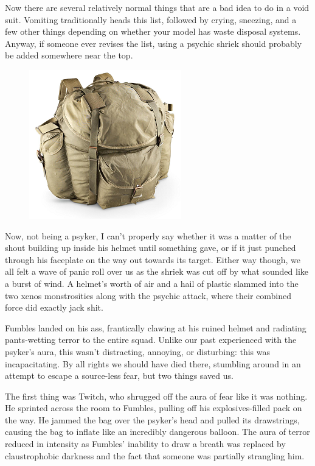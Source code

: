 Now there are several relatively normal things that are a bad idea to do in a void suit. 
Vomiting traditionally heads this list, followed by crying, sneezing, and a few other things depending on whether your model has waste disposal systems. 
Anyway, if someone ever revises the list, using a psychic shriek should probably be added somewhere near the top.

\begin{figure}
	\begin{center}
		\includegraphics[width=\figwidth]{pics/11/51.png}
	\end{center}
\end{figure}
Now, not being a psyker, I can't properly say whether it was a matter of the shout building up inside his helmet until something gave, or if it just punched through his faceplate on the way out towards its target. 
Either way though, we all felt a wave of panic roll over us as the shriek was cut off by what sounded like a burst of wind. 
A helmet's worth of air and a hail of plastic slammed into the two xenos monstrosities along with the psychic attack, where their combined force did exactly jack shit.

Fumbles landed on his ass, frantically clawing at his ruined helmet and radiating pants-wetting terror to the entire squad. 
Unlike our past experienced with the psyker's aura, this wasn't distracting, annoying, or disturbing: 
this was incapacitating. 
By all rights we should have died there, stumbling around in an attempt to escape a source-less fear, but two things saved us. 


The first thing was Twitch, who shrugged off the aura of fear like it was nothing. 
He sprinted across the room to Fumbles, pulling off his explosives-filled pack on the way. 
He jammed the bag over the psyker's head and pulled its drawstrings, causing the bag to inflate like an incredibly dangerous balloon. 
The aura of terror reduced in intensity as Fumbles' inability to draw a breath was replaced by claustrophobic darkness and the fact that someone was partially strangling him.

